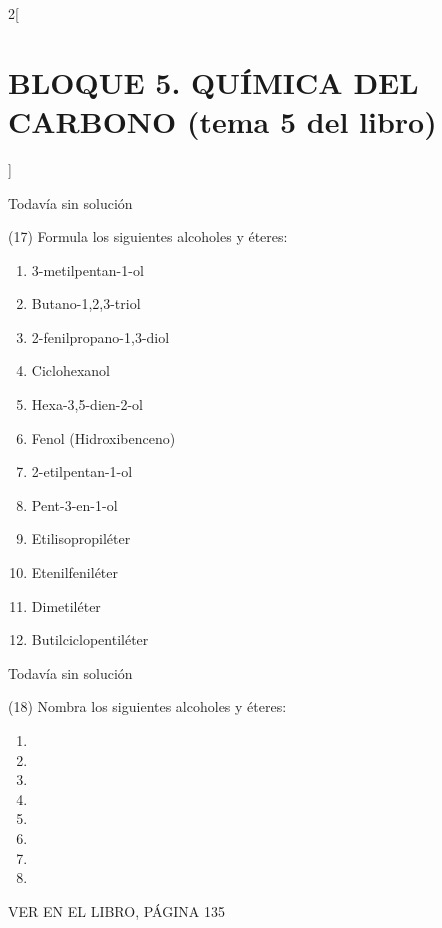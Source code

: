 \documentclass[10pt]{article}
\begin{document}
\begin{multicols}{2}[
  \section{BLOQUE 5. QUÍMICA DEL CARBONO (tema 5 del libro)}
  ]
\begin{solution}[print=false]
  Todavía sin solución
\end{solution}




\begin{exercise}[
    tags    = {},
    topics  = {química,química básica},
    source  = {FQ 1B MGH 2016, p85, e26},
  ]

  (17) Formula los siguientes alcoholes y éteres:
  \begin{enumerate}
    \item 3-metilpentan-1-ol
    \item Butano-1,2,3-triol
    \item 2-fenilpropano-1,3-diol
    \item Ciclohexanol
    \item Hexa-3,5-dien-2-ol
    \item Fenol (Hidroxibenceno)
    \item 2-etilpentan-1-ol
    \item Pent-3-en-1-ol
    \item Etilisopropiléter
    \item Etenilfeniléter
    \item Dimetiléter
    \item Butilciclopentiléter
  \end{enumerate}
\end{exercise}

\begin{solution}[print=false]
  Todavía sin solución
\end{solution}




\begin{exercise}[
    tags    = {},
    topics  = {química,química básica},
    source  = {FQ 1B MGH 2016, p85, e26},
  ]

  (18) Nombra los siguientes alcoholes y éteres:
  \begin{enumerate}
    \item {}
    \item {}
    \item {}
    \item {}
    \item {}
    \item {}
    \item {}
    \item {}
  \end{enumerate}
  VER EN EL LIBRO, PÁGINA 135
\end{exercise}


\end{multicols}
\end{document}
